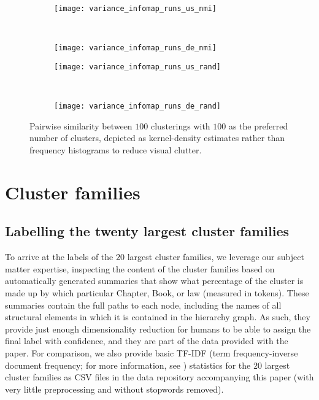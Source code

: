 \begin{figure}[H]
	\centering
	\begin{subfigure}{0.5\linewidth}
		\texttt{[image: variance\_infomap\_runs\_us\_nmi]}
	\end{subfigure}~%
	\begin{subfigure}{0.5\linewidth}
		\texttt{[image: variance\_infomap\_runs\_de\_nmi]}
	\end{subfigure}
	\begin{subfigure}{0.5\linewidth}
		\texttt{[image: variance\_infomap\_runs\_us\_rand]}
	\end{subfigure}~%
	\begin{subfigure}{0.5\linewidth}
		\texttt{[image: variance\_infomap\_runs\_de\_rand]}
	\end{subfigure}
	\caption{Pairwise similarity between $100$ clusterings with $100$ as the preferred number of clusters, depicted as kernel-density estimates rather than frequency histograms to reduce visual clutter.}
	\label{fig:consensus-within}
\end{figure}

\newpage

\section{Cluster families}\label{sec:labelling}

\subsection{Labelling the twenty largest cluster families}

To arrive at the labels of the $20$ largest cluster families, 
we leverage our subject matter expertise, 
inspecting the content of the cluster families based on automatically generated summaries that show what percentage of the cluster is made up by which particular Chapter, Book, or law (measured in tokens). 
These summaries contain the full paths to each node, including the names of all structural elements in which it is contained in the hierarchy graph. 
As such, they provide just enough dimensionality reduction for humans to be able to assign the final label with confidence, and they are part of the data provided with the paper. 
For comparison, we also provide basic TF-IDF (term frequency-inverse document frequency; for more information, see \cite{schutze2008}) statistics for the $20$ largest cluster families as CSV files in the data repository accompanying this paper (with very little preprocessing and without stopwords removed). 
 
